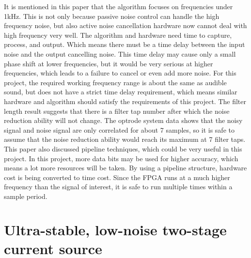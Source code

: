 It is mentioned in this paper that the algorithm focuses on frequencies under 1kHz.  This is not only because passive noise control can handle the high frequency noise, but also active noise cancellation hardware now cannot deal with high frequency very well.  The algorithm and hardware need time to capture, process, and output.  Which means there must be a time delay between the input noise and the output cancelling noise.  This time delay may cause only a small phase shift at lower frequencies, but it would be very serious at higher frequencies, which leads to a failure to cancel or even add more noise.  For this project, the required working frequency range is about the same as audible sound, but does not have a strict time delay requirement, which means similar hardware and algorithm should satisfy the requirements of this project.  The filter length result suggests that there is a filter tap number after which the noise reduction ability will not change.  The optrode system data shows that the noisy signal and noise signal are only correlated for about 7 samples, so it is safe to assume that the noise reduction ability would reach its maximum at 7 filter taps.  This paper also discussed pipeline techniques, which could be very useful in this project.  In this project, more data bits may be used for higher accuracy, which means a lot more resources will be taken.  By using a pipeline structure, hardware cost is being converted to time cost.  Since the FPGA runs at a much higher frequency than the signal of interest, it is safe to run multiple times within a sample period.

\section{Ultra-stable, low-noise two-stage current source}

